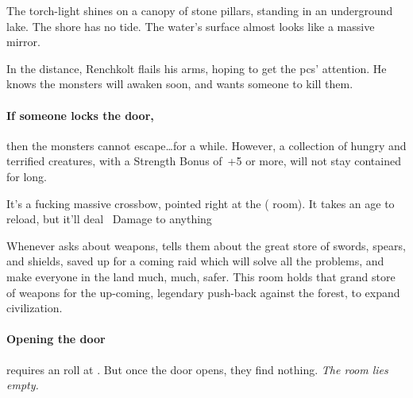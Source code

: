 \begin{multicols}{2}
\begin{boxtext}
  The \gls{torch}-light shines on a canopy of stone pillars, standing in an underground lake.
  The shore has no tide.
  The water's surface almost looks like a massive mirror.
\end{boxtext}



In the distance, Renchkolt flails his arms, hoping to get the \glspl{pc}' attention.
He knows the \glspl{monster} will awaken soon, and wants someone to kill them.


\paragraph{If someone locks the door,}
then the \glspl{monster} cannot escape\ldots for a while.
However, a collection of hungry and terrified creatures, with a Strength Bonus of~+5 or more, will not stay contained for long.


It's a fucking massive crossbow, pointed right at the  ( room).
It takes an age to reload, but it'll deal ~Damage to anything


\begin{exampletext}
  Whenever  asks about \glspl{weapon},  tells them about the great store of swords, spears, and shields, saved up for a coming raid which will solve all the problems, and make everyone in the land much, much, safer.
  This room holds that grand store of weapons for the up-coming, legendary push-back against the forest, to expand civilization.
\end{exampletext}

\paragraph{Opening the door}
requires an  roll at \tn[12].
But once the door opens, they find nothing.
\emph{The room lies empty.}


\end{multicols}
